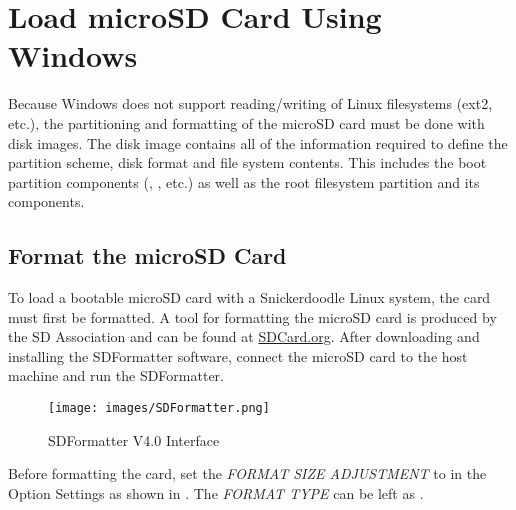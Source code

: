 %
%



\section{Load microSD Card Using Windows}

Because Windows does not support reading/writing of Linux filesystems (ext2, etc.), the partitioning and formatting of the microSD card must be done with disk images. The disk image contains all of the information required to define the partition scheme, disk format and file system contents. This includes the boot partition components (, , etc.) as well as the root filesystem partition and its components.


\subsection{Format the microSD Card}


To load a bootable microSD card with a Snickerdoodle Linux system, the card must first be formatted. A tool for formatting the microSD card is produced by the SD Association and can be found at \href{https://www.sdcard.org/downloads/formatter_4}{SDCard.org}. After downloading and installing the SDFormatter software, connect the microSD card to the host machine and run the SDFormatter. \\


\begin{figure}
	\centering
	\texttt{[image: images/SDFormatter.png]}
	\caption{SDFormatter V4.0 Interface}
\end{figure}


\newpage
Before formatting the card, set the \textit{FORMAT SIZE ADJUSTMENT} to  in the Option Settings as shown in . The \textit{FORMAT TYPE} can be left as . \\


